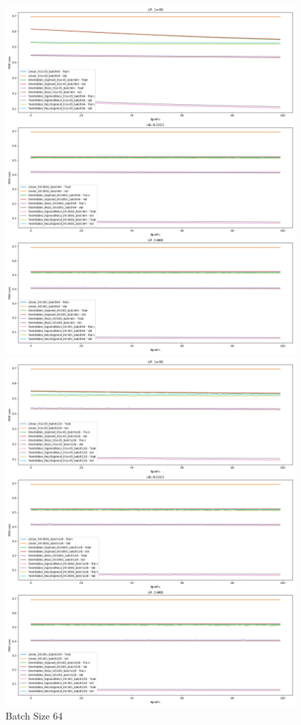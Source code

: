 \begin{figure}[!h]
\begin{minipage}{0.32\linewidth}
        \includegraphics[width=\linewidth]{crossentropy_batch64.png}
        \caption{Batch Size 64}
    \end{minipage}
    \hfill
    \begin{minipage}{0.32\linewidth}
        \includegraphics[width=\linewidth]{crossentropy_batch128.png}

\end{minipage}
\end{figure}
